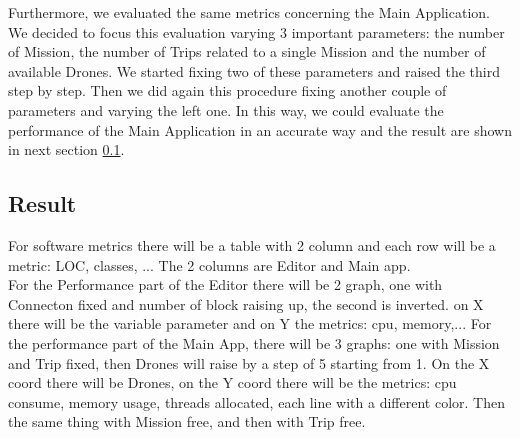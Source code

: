 Furthermore, we evaluated the same metrics concerning the Main Application. We decided to focus this evaluation varying 3 important parameters: the number of Mission, the number of Trips related to a single Mission and the number of available Drones. We started fixing two of these parameters and raised the third step by step. Then we did again this procedure fixing another couple of parameters and varying the left one. In this way, we could evaluate the performance of the Main Application in an accurate way and the result are shown in next section \ref{metricsResult}.

\subsection{Result}
\label{metricsResult}

For software metrics there will be a table with 2 column and each row will be a metric: LOC, classes, ... The 2 columns are Editor and Main app.
\\
For the Performance part of the Editor there will be 2 graph, one with Connecton fixed and number of block raising up, the second is inverted. on X there will be the variable parameter and on Y the metrics: cpu, memory,...
For the performance part of the Main App, there will be 3 graphs: one with Mission and Trip fixed, then Drones will raise by a step of 5 starting from 1. On the X coord there will be Drones, on the Y coord there will be the metrics: cpu consume, memory usage, threads allocated, each line with a different color.
Then the same thing with Mission free, and then with Trip free.



